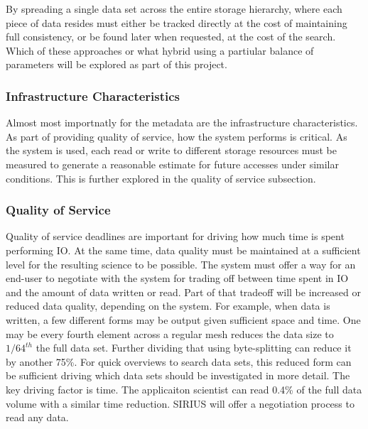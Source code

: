 By spreading a single data set across the entire storage hierarchy, where each
piece of data resides must either be tracked directly at the cost of
maintaining full consistency, or be found later when requested, at the cost of
the search. Which of these approaches or what hybrid using a partiular balance
of parameters will be explored as part of this project.

\subsubsection{Infrastructure Characteristics}

Almost most importnatly for the metadata are the infrastructure
characteristics. As part of providing quality of service, how the system
performs is critical.  As the system is used, each read or write to different
storage resources must be measured to generate a reasonable estimate for future
accesses under similar conditions. This is further explored in the quality of
service subsection.

\subsubsection{Quality of Service}

Quality of service deadlines are important for driving how much time is spent
performing IO. At the same time, data quality must be maintained at a
sufficient level for the resulting science to be possible.  The system must
offer a way for an end-user to negotiate with the system for trading off
between time spent in IO and the amount of data written or read.  Part of that
tradeoff will be increased or reduced data quality, depending on the system.
For example, when data is written, a few different forms may be output given
sufficient space and time. One may be every fourth element across a regular
mesh reduces the data size to $1/64^{th}$ the full data set.  Further dividing
that using byte-splitting can reduce it by another 75\%. For quick overviews to
search data sets, this reduced form can be sufficient driving which data sets
should be investigated in more detail. The key driving factor is time. The
applicaiton scientist can read 0.4\% of the full data volume with a similar
time reduction. SIRIUS will offer a negotiation process to read any data.

